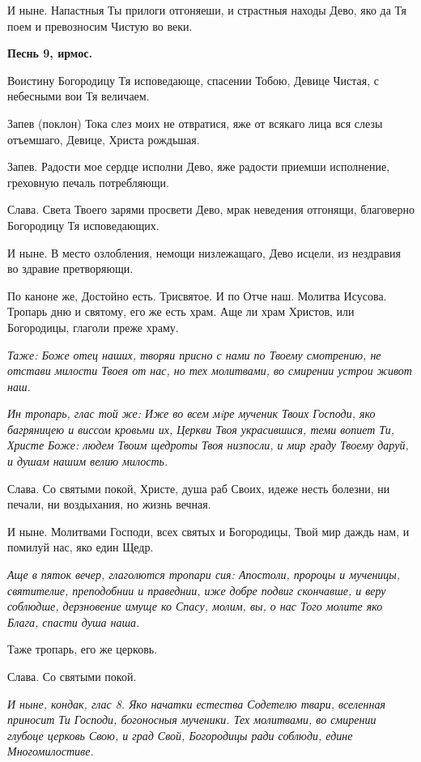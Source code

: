 И ныне. Напастныя Ты прилоги отгоняеши, и страстныя находы Дево, яко да Тя поем и превозносим Чистую во веки.


\medskip


\bfseries Песнь 9, ирмос.\normalfont{}\nopagebreak


Воистину Богородицу Тя исповедающе, спасении Тобою, Девице Чистая, с небесными вои Тя величаем.

Запев (поклон) Тока слез моих не отвратися, яже от всякаго лица вся слезы отъемшаго, Девице, Христа  рождьшая.

Запев. Радости мое сердце исполни Дево, яже радости приемши исполнение, греховную печаль потребляющи.

Слава. Света Твоего зарями просвети Дево, мрак неведения отгонящи, благоверно Богородицу Тя исповедающих.

И ныне. В место озлобления, немощи низлежащаго, Дево исцели, из нездравия во здравие претворяющи.

По каноне же, Достойно есть. Трисвятое. И по Отче наш. Молитва Исусова. Тропарь дню и святому, его же есть храм. Аще ли храм Христов, или Богородицы, глаголи преже храму.


\itshape Таже:\normalfont{} Боже отец наших, творяи присно с нами по Твоему смотрению, не отстави милости Твоея от нас, но тех молитвами, во смирении устрои живот наш.


\itshape Ин тропарь, глас той же:\normalfont{} Иже во всем мiре мученик Твоих Господи, яко багряницею и виссом кровьми их, Церкви Твоя украсившися, теми вопиет Ти, Христе Боже: людем Твоим щедроты Твоя низпосли, и мир граду Твоему даруй, и душам нашим велию милость.

Слава. Со святыми покой, Христе, душа раб Своих, идеже несть болезни, ни печали, ни воздыхания, но жизнь вечная.

И ныне. Молитвами Господи, всех святых и Богородицы, Твой мир даждь нам, и помилуй нас, яко един Щедр.


\itshape Аще в пяток вечер, глаголются тропари сия:\normalfont{} Апостоли, пророцы и мученицы, святителие, преподобнии и праведнии, иже добре подвиг скончавше, и веру соблюдше, дерзновение имуще ко Спасу, молим, вы, о нас Того молите яко Блага, спасти душа наша.

Таже тропарь, его же церковь.

Слава. Со святыми покой.


\itshape И ныне, кондак, глас 8.\normalfont{} Яко начатки естества Содетелю твари, вселенная приносит Ти Господи, богоносныя мученики. Тех молитвами, во смирении глубоце церковь Свою, и град Свой, Богородицы ради соблюди, едине Многомилостиве.


